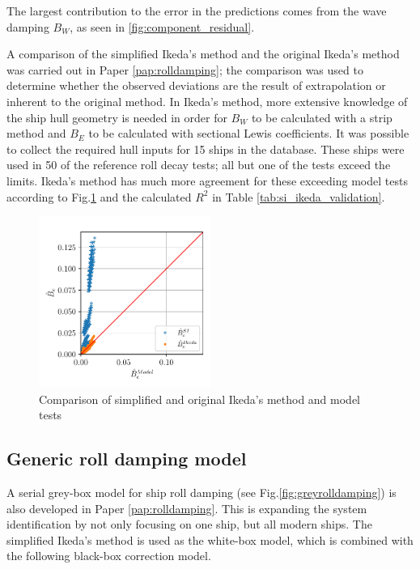 

\noindent The largest contribution to the error in the predictions comes from the wave damping $B_W$, as seen in \autoref{fig:component_residual}.
\begin{figure}[H]
    
\end{figure}
\noindent A comparison of the simplified Ikeda's method and the original Ikeda's method was carried out in Paper \ref{pap:rolldamping}; the comparison was used to determine whether the observed deviations are the result of extrapolation or inherent to the original method. In Ikeda's method, more extensive knowledge of the ship hull geometry is needed in order for $B_W$ to be calculated with a strip method and $B_E$ to be calculated with sectional Lewis coefficients. It was possible to collect the required hull inputs for 15 ships in the database. These ships were used in 50 of the reference roll decay tests; all but one of the tests exceed the limits. Ikeda's method has much more agreement for these exceeding model tests according to Fig.\ref{fig:si_ikeda_model} and the calculated $R^2$ in Table \ref{tab:si_ikeda_validation}.

\begin{figure}[H]
    \centering
    \includegraphics[width=0.50\textwidth]{kappa/images/si_ikeda_model.pdf}
    \caption{Comparison of simplified and original Ikeda's method and model tests}
    \label{fig:si_ikeda_model}

\end{figure}





\subsection{Generic roll damping model}
\label{sec:genericrolldampingmodel}
A serial grey-box model for ship roll damping (see Fig.\ref{fig:greyrolldamping}) is also developed in Paper \ref{pap:rolldamping}. 
This is expanding the system identification by not only focusing on one ship, but all modern ships. 
The simplified Ikeda's method \cite{kawahara_simple_2011} is used as the white-box model, which is combined with the following black-box correction model.

